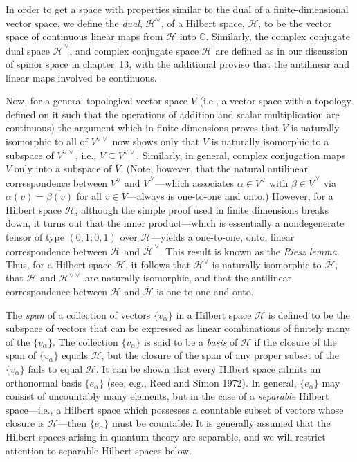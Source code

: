 In order to get a space with properties similar to the dual of a finite-dimensional
vector space, we define the \emph{dual}, \(\mathcal H^\vee\), of a Hilbert space,
\(\mathcal H\), to be the vector space of continuous linear maps from \(\mathcal H\)
into \(\mathbb C\). Similarly, the complex conjugate dual space
\(\overline{\mathcal H}^{\,\vee}\), and complex conjugate space
\(\overline{\mathcal H}\) are defined as in our discussion of spinor space in
chapter~13, with the additional proviso that the antilinear and linear maps involved
be continuous.

Now, for a general topological vector space \(V\) (i.e., a vector space with a
topology defined on it such that the operations of addition and scalar multiplication
are continuous) the argument which in finite dimensions proves that \(V\) is
naturally isomorphic to all of \(V^{\vee\vee}\) now shows only that \(V\) is naturally
isomorphic to a subspace of \(V^{\vee\vee}\), i.e., \(V\subseteq V^{\vee\vee}\). Similarly, in
general, complex conjugation maps \(V\) only into a subspace of \(\overline V\).
(Note, however, that the natural antilinear correspondence between \(V^\vee\) and
\(\overline V^{\,\vee}\)---which associates \(\alpha\in V^\vee\) with
\(\beta\in\overline V^{\,\vee}\) via
\(\alpha(v)=\overline{\beta(\overline v)}\) for all \(v\in V\)---always is
one-to-one and onto.) However, for a Hilbert space \(\mathcal H\), although the
simple proof used in finite dimensions breaks down, it turns out that the inner
product---which is essentially a nondegenerate tensor of type \((0,1;0,1)\) over
\(\mathcal H\)---yields a one-to-one, onto, linear correspondence between
\(\mathcal H\) and \(\overline{\mathcal H}^{\,\vee}\). This result is known as the
\emph{Riesz lemma}. Thus, for a Hilbert space \(\mathcal H\), it follows that
\(\mathcal H^\vee\) is naturally isomorphic to \(\overline{\mathcal H}\), that
\(\mathcal H\) and \(\mathcal H^{\vee\vee}\) are naturally isomorphic, and that the
antilinear correspondence between \(\mathcal H\) and \(\overline{\mathcal H}\)
is one-to-one and onto.

The \emph{span} of a collection of vectors \(\{v_\alpha\}\) in a Hilbert space
\(\mathcal H\) is defined to be the subspace of vectors that can be expressed as
linear combinations of finitely many of the \(\{v_\alpha\}\). The collection
\(\{v_\alpha\}\) is said to be a \emph{basis} of \(\mathcal H\) if the closure of
the span of \(\{v_\alpha\}\) equals \(\mathcal H\), but the closure of the span of
any proper subset of the \(\{v_\alpha\}\) fails to equal \(\mathcal H\). It can be
shown that every Hilbert space admits an orthonormal basis \(\{e_\alpha\}\) (see,
e.g., Reed and Simon 1972). In general, \(\{e_\alpha\}\) may consist of
uncountably many elements, but in the case of a \emph{separable} Hilbert
space---i.e., a Hilbert space which possesses a countable subset of vectors whose
closure is \(\mathcal H\)---then \(\{e_\alpha\}\) must be countable. It is generally
assumed that the Hilbert spaces arising in quantum theory are separable, and we will
restrict attention to separable Hilbert spaces below.

